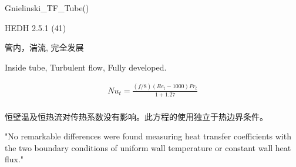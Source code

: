 \documentclass{report}
\begin{document}
Gnielinski\_TF\_Tube()

HEDH 2.5.1 (41)

管内，湍流, 完全发展

Inside tube, Turbulent flow, Fully developed.

\begin{multline}
	Nu_t=
	\frac{\left(f/8\right)\left(Re_t-1000\right)Pr_t}
	{1+1.27}\\
\end{multline}

恒壁温及恒热流对传热系数没有影响。此方程的使用独立于热边界条件。

"No remarkable differences were found measuring heat transfer coefficients with the two boundary conditions of uniform wall temperature or constant wall heat flux."
\end{document}
